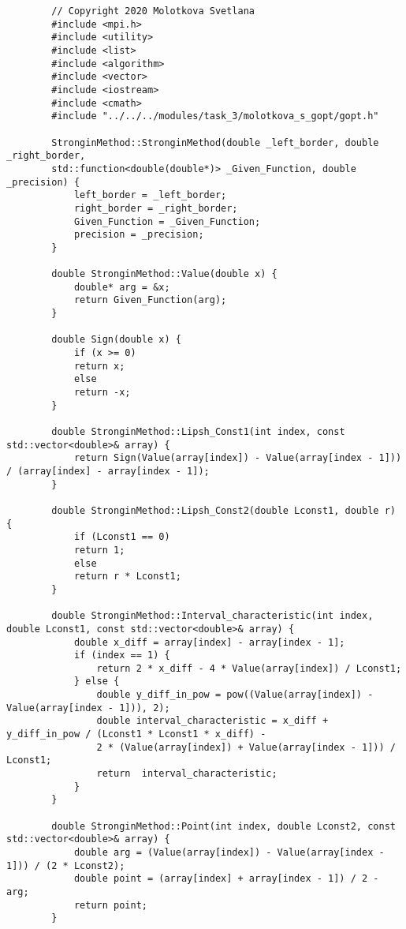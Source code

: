 \documentclass{report}
\begin{document}
	\begin{lstlisting}
		// Copyright 2020 Molotkova Svetlana
		#include <mpi.h>
		#include <utility>
		#include <list>
		#include <algorithm>
		#include <vector>
		#include <iostream>
		#include <cmath>
		#include "../../../modules/task_3/molotkova_s_gopt/gopt.h"
		
		StronginMethod::StronginMethod(double _left_border, double _right_border,
		std::function<double(double*)> _Given_Function, double _precision) {
			left_border = _left_border;
			right_border = _right_border;
			Given_Function = _Given_Function;
			precision = _precision;
		}
		
		double StronginMethod::Value(double x) {
			double* arg = &x;
			return Given_Function(arg);
		}
		
		double Sign(double x) {
			if (x >= 0)
			return x;
			else
			return -x;
		}
		
		double StronginMethod::Lipsh_Const1(int index, const std::vector<double>& array) {
			return Sign(Value(array[index]) - Value(array[index - 1])) / (array[index] - array[index - 1]);
		}
		
		double StronginMethod::Lipsh_Const2(double Lconst1, double r) {
			if (Lconst1 == 0)
			return 1;
			else
			return r * Lconst1;
		}
		
		double StronginMethod::Interval_characteristic(int index, double Lconst1, const std::vector<double>& array) {
			double x_diff = array[index] - array[index - 1];
			if (index == 1) {
				return 2 * x_diff - 4 * Value(array[index]) / Lconst1;
			} else {
				double y_diff_in_pow = pow((Value(array[index]) - Value(array[index - 1])), 2);
				double interval_characteristic = x_diff + y_diff_in_pow / (Lconst1 * Lconst1 * x_diff) -
				2 * (Value(array[index]) + Value(array[index - 1])) / Lconst1;
				return  interval_characteristic;
			}
		}
		
		double StronginMethod::Point(int index, double Lconst2, const std::vector<double>& array) {
			double arg = (Value(array[index]) - Value(array[index - 1])) / (2 * Lconst2);
			double point = (array[index] + array[index - 1]) / 2 - arg;
			return point;
		}
		

\end{lstlisting}
\end{document}
